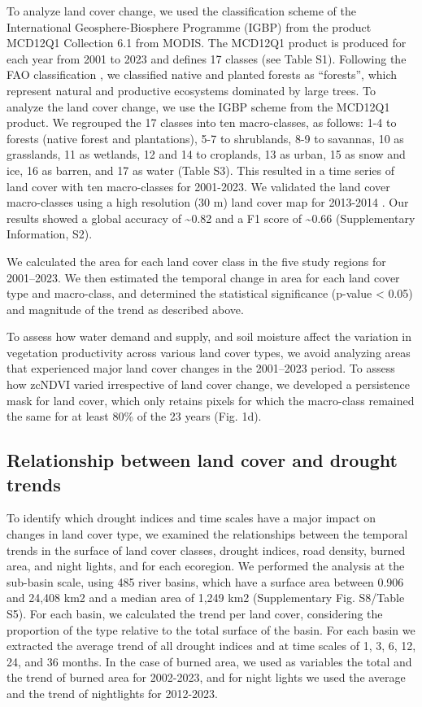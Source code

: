 \documentclass[
  sn-nature,
  numbered]{sn-jnl}
\begin{document}
To analyze land cover change, we used the classification scheme of the
International Geosphere-Biosphere Programme (IGBP) from the product
MCD12Q1 Collection 6.1 from MODIS. The MCD12Q1 product is produced for
each year from 2001 to 2023 and defines 17 classes (see Table S1).
Following the FAO classification \citep{FAO2022}, we classified native
and planted forests as ``forests'', which represent natural and
productive ecosystems dominated by large trees. To analyze the land
cover change, we use the IGBP scheme from the MCD12Q1 product. We
regrouped the 17 classes into ten macro-classes, as follows: 1-4 to
forests (native forest and plantations), 5-7 to shrublands, 8-9 to
savannas, 10 as grasslands, 11 as wetlands, 12 and 14 to croplands, 13
as urban, 15 as snow and ice, 16 as barren, and 17 as water (Table S3).
This resulted in a time series of land cover with ten macro-classes for
2001-2023. We validated the land cover macro-classes using a high
resolution (30 m) land cover map for 2013-2014 \citep{Zhao2016}. Our
results showed a global accuracy of \textasciitilde0.82 and a F1 score
of \textasciitilde0.66 (Supplementary Information, S2).

We calculated the area for each land cover class in the five study
regions for 2001--2023. We then estimated the temporal change in area
for each land cover type and macro-class, and determined the statistical
significance (p-value \textless{} 0.05) and magnitude of the trend as
described above.

To assess how water demand and supply, and soil moisture affect the
variation in vegetation productivity across various land cover types, we
avoid analyzing areas that experienced major land cover changes in the
2001--2023 period. To assess how zcNDVI varied irrespective of land
cover change, we developed a persistence mask for land cover, which only
retains pixels for which the macro-class remained the same for at least
80\% of the 23 years (Fig. 1d).

\subsection{Relationship between land cover and drought
trends}\label{relationship-between-land-cover-and-drought-trends}

To identify which drought indices and time scales have a major impact on
changes in land cover type, we examined the relationships between the
temporal trends in the surface of land cover classes, drought indices,
road density, burned area, and night lights, and for each ecoregion. We
performed the analysis at the sub-basin scale, using 485 river basins,
which have a surface area between 0.906 and 24,408 km2 and a median area
of 1,249 km2 (Supplementary Fig. S8/Table S5). For each basin, we
calculated the trend per land cover, considering the proportion of the
type relative to the total surface of the basin. For each basin we
extracted the average trend of all drought indices and at time scales of
1, 3, 6, 12, 24, and 36 months. In the case of burned area, we used as
variables the total and the trend of burned area for 2002-2023, and for
night lights we used the average and the trend of nightlights for
2012-2023.
\end{document}
